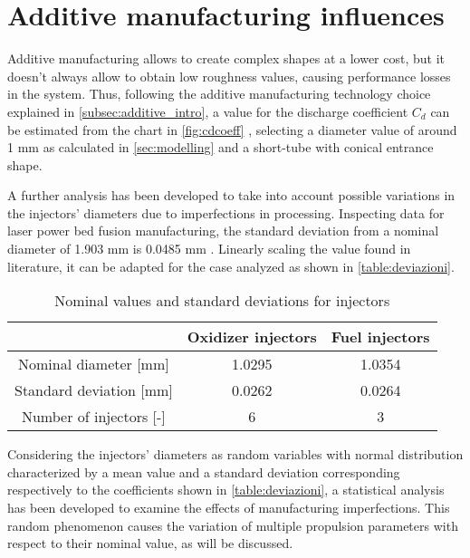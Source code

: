 \pagebreak
\section{Additive manufacturing influences}
\label{sec:additive}


Additive manufacturing allows to create complex shapes at a lower cost, but it doesn't always allow to obtain low roughness values, causing performance losses in the system. Thus, following the additive manufacturing technology choice explained in \autoref{subsec:additive_intro}, a value for the discharge coefficient $C_d$ can be estimated from the chart in \autoref{fig:cdcoeff} \cite{valori_cd}, selecting a diameter value of around 1 mm as calculated in \autoref{sec:modelling} and a short-tube with conical entrance shape.

A further analysis has been developed to take into account possible variations in the injectors' diameters due to imperfections in processing. Inspecting data for laser power bed fusion manufacturing, the standard deviation from a nominal diameter of 1.903 mm is 0.0485 mm \cite{lpbf_accuracy}. Linearly scaling the value found in literature, it can be adapted for the case analyzed as shown in \autoref{table:deviazioni}.

\vspace*{5mm}

\begin{table}[H]
    \renewcommand{\arraystretch}{1.5}
    \centering
    \begin{tabular}{|c|c|c|}
        \hline
         & \textbf{Oxidizer injectors} & \textbf{Fuel injectors}\\
        \hline
        \hline
        Nominal diameter [mm] & 1.0295 & 1.0354 \\ 
        \hline
        Standard deviation [mm] & 0.0262 & 0.0264 \\
        \hline
        Number of injectors [-] & 6 & 3 \\
        \hline
    \end{tabular}
    \caption{Nominal values and standard deviations for injectors}
    \label{table:deviazioni}
\end{table}

Considering the injectors' diameters as random variables with normal distribution characterized by a mean value and a standard deviation corresponding respectively to the coefficients shown in \autoref{table:deviazioni}, a statistical analysis has been developed to examine the effects of manufacturing imperfections. This random phenomenon causes the variation of multiple propulsion parameters with respect to their nominal value, as will be discussed.

